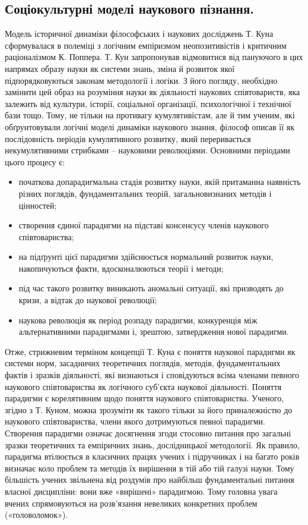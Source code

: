 \subsection{Соціокультурні моделі наукового пізнання.} Модель історичної
динаміки філософських і наукових досліджень Т. Куна сформувалася в
полеміці з логічним емпіризмом неопозитивістів і критичним раціоналізмом К.
Поппера. Т. Кун запропонував відмовитися від пануючого в цих напрямах
образу науки як системи знань, зміна й розвиток якої підпорядковуються
законам методології і логіки. З його погляду, необхідно замінити цей образ на
розуміння науки як діяльності наукових співтовариств, яка залежить від
культури, історії, соціальної організації, психологічної і технічної бази тощо.
Тому, не тільки на противагу кумулятивістам, але й тим ученим, які
обґрунтовували логічні моделі динаміки наукового знання, філософ описав її як
послідовність періодів кумулятивного розвитку, який переривається
некумулятивними стрибками – науковими революціями. Основними періодами
цього процесу є:
\begin{itemize}
	\item початкова допарадигмальна стадія розвитку науки, якій притаманна
	наявність різних поглядів, фундаментальних теорій, загальновизнаних методів і
	цінностей;
	
	\item створення єдиної парадигми на підставі консенсусу членів наукового
	співтовариства;

	\item на підґрунті цієї парадигми здійснюється нормальний розвиток науки,
	накопичуються факти, вдосконалюються теорії і методи;

	\item під час такого розвитку виникають аномальні ситуації, які призводять до
	кризи, а відтак до наукової революції;

	\item наукова революція як період розпаду парадигми, конкуренція між
	альтернативними парадигмами і, зрештою, затвердження нової парадигми.
\end{itemize}

Отже, стрижневим терміном концепції Т. Куна є поняття наукової
парадигми як системи норм, засадничих теоретичних поглядів, методів,
фундаментальних фактів і зразків діяльності, які визнаються і сповідуються
всіма членами певного наукового співтовариства як логічного суб’єкта наукової
діяльності. Поняття парадигми є корелятивним щодо поняття наукового
співтовариства. Ученого, згідно з Т. Куном, можна зрозуміти як такого тільки
за його приналежністю до наукового співтовариства, члени якого
дотримуються певної парадигми. Створення парадигми означає досягнення
згоди стосовно питання про загальні зразки теоретичних та емпіричних знань,
дослідницької методології. Як правило, парадигма втілюється в класичних
працях учених і підручниках і на багато років визначає коло проблем та методів
їх вирішення в тій або тій галузі науки. Тому більшість учених звільнена від
роздумів про найбільш фундаментальні питання власної дисципліни: вони вже
«вирішені» парадигмою. Тому головна увага вчених спрямовуються на
розв’язання невеликих конкретних проблем («головоломок»).

